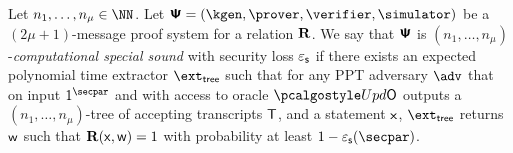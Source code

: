 \begin{definition}
	Let $n_1, \ldots, n_\mu \in \NN$. Let $\proofsystem = (\kgen, \prover, \verifier, \simulator)$ be a $(2 \mu +
	1)$-message proof system for a relation $\mathbf{R}$. 
	We say that $\bm{\mathsf{\Psi}}$ is $(n_1,
	\ldots, n_\mu)$-\emph{computational special sound} with security loss $\varepsilon_{\mathsf{s}}$ if there exists an expected polynomial time extractor $\extt$ such that for any PPT adversary $\adv$ that on input $1^\secpar$ and with access to oracle $\initU$ outputs a $(n_1,
	\ldots, n_\mu)$-tree of accepting transcripts $\mathsf{T}$, and a statement $\mathsf{x}$, $\extt$ returns $\mathsf{w}$ such that $\mathbf{R}(\mathsf{x}, \mathsf{w}) = 1$ with probability at least $1-\epss(\secpar)$. 
\end{definition}

%

